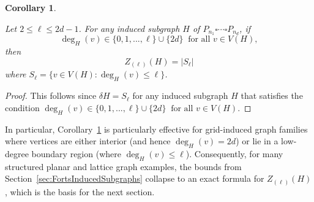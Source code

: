 \documentclass[11pt]{article}
\theoremstyle{plain} \newtheorem{question}{Question}
\newtheorem{thm}{Theorem}
\newtheorem{cor}[thm]{Corollary}
\theoremstyle{definition}
\begin{document}
\begin{cor}\label{cor:ClassifyLeaky}

Let $2\le \ell \le 2d-1$. For any induced subgraph $H$ of $P_{n_1}\square \cdots \square P_{n_d}$, if 
\[\deg_H(v) \in \{0,1,...,\ell\} \cup \{2d\} \ \text{ for all } v \in V(H),\]
then \[Z_{(\ell)}(H) = |S_{\ell}|\]
where $S_\ell = \{v\in V(H) : \deg_H(v) \le \ell\}$.
 
\end{cor}

\begin{proof}
    This follows since $\delta H = S_{\ell}$ for any induced subgraph $H$ that satisfies the condition $\deg_H(v) \in \{0,1,...,\ell\} \cup \{2d\} \ \text{ for all } v \in V(H)$. 
\end{proof}

In particular, Corollary~\ref{cor:ClassifyLeaky} is particularly effective for grid-induced graph families where vertices are either interior (and hence $\deg_H(v)=2d$) or lie in a low-degree boundary region (where $\deg_H(v)\le \ell$). Consequently, for many structured planar and lattice graph examples, the bounds from Section~\ref{sec:FortsInducedSubgraphs} collapse to an exact formula for $Z_{(\ell)}(H)$, which is the basis for the next section.





\end{document}

